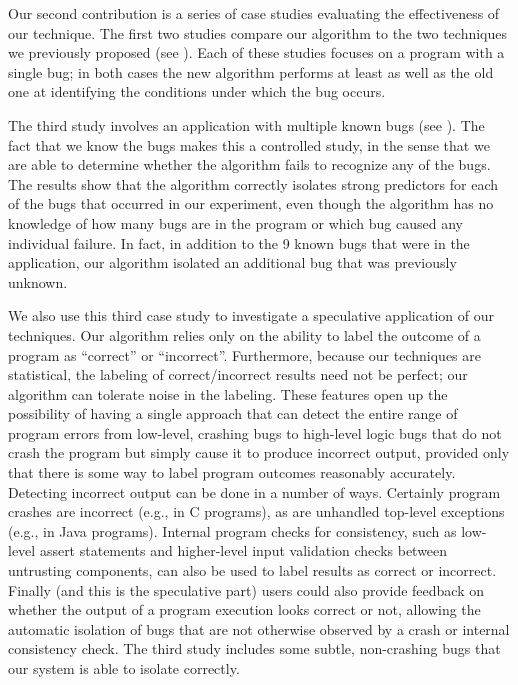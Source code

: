 \documentclass{sig-alternate}
\begin{document}
Our second contribution is a series of case studies evaluating the effectiveness of
our technique.  The first two studies compare our algorithm to the two techniques
we previously proposed (see ).  Each of these studies focuses on a
program with a single bug; in both cases the new algorithm
performs at least as well as the old one at identifying the conditions under which the bug occurs.  

The third study involves an application with multiple known bugs (see
).  The fact that we know the bugs makes this a controlled study, 
in the sense that we are able to determine whether the algorithm fails to recognize any of the
bugs.  The results show that the algorithm correctly
isolates strong predictors for each of the bugs that occurred in our
experiment, even though the algorithm has no knowledge of how many
bugs are in the program or which bug caused any individual failure.
In fact, in addition to the 9 known bugs that were in the application,
our algorithm isolated an additional bug that was previously unknown.

We also use this third case study to investigate a speculative
application of our techniques.  Our algorithm relies only on the
ability to label the outcome of a program as ``correct'' or
``incorrect''.  Furthermore, because our techniques are statistical,
the labeling of correct/incorrect results need not be perfect; our
algorithm can tolerate noise in the labeling.  These features open up
the possibility of having a single approach that can detect the entire
range of program errors from low-level, crashing bugs to high-level
logic bugs that do not crash the program but simply cause it to
produce incorrect output, provided only that there is some way to
label program outcomes reasonably accurately.  Detecting incorrect
output can be done in a number of ways.  Certainly program crashes are
incorrect (e.g., in C programs), as are unhandled top-level exceptions
(e.g., in Java programs).  Internal program checks for consistency,
such as low-level assert statements and higher-level input validation
checks between untrusting components, can also be used to label
results as correct or incorrect.  Finally (and this is the speculative
part) users could also provide feedback on whether the output of a
program execution looks correct or not, allowing the automatic
isolation of bugs that are not otherwise observed by a crash or
internal consistency check.  The third study includes some subtle,
non-crashing bugs that our system is able to isolate correctly.
\end{document}
